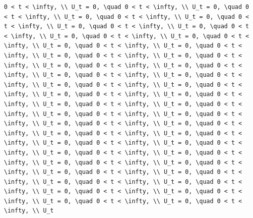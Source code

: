 \documentclass[
  ukrainian,
]{article}
\begin{document}
\begin{verbatim}
0 < t < \infty, \\ U_t = 0, \quad 0 < t < \infty, \\ U_t = 0, \quad 0 < t < \infty, \\ U_t = 0, \quad 0 < t < \infty, \\ U_t = 0, \quad 0 < t < \infty, \\ U_t = 0, \quad 0 < t < \infty, \\ U_t = 0, \quad 0 < t < \infty, \\ U_t = 0, \quad 0 < t < \infty, \\ U_t = 0, \quad 0 < t < \infty, \\ U_t = 0, \quad 0 < t < \infty, \\ U_t = 0, \quad 0 < t < \infty, \\ U_t = 0, \quad 0 < t < \infty, \\ U_t = 0, \quad 0 < t < \infty, \\ U_t = 0, \quad 0 < t < \infty, \\ U_t = 0, \quad 0 < t < \infty, \\ U_t = 0, \quad 0 < t < \infty, \\ U_t = 0, \quad 0 < t < \infty, \\ U_t = 0, \quad 0 < t < \infty, \\ U_t = 0, \quad 0 < t < \infty, \\ U_t = 0, \quad 0 < t < \infty, \\ U_t = 0, \quad 0 < t < \infty, \\ U_t = 0, \quad 0 < t < \infty, \\ U_t = 0, \quad 0 < t < \infty, \\ U_t = 0, \quad 0 < t < \infty, \\ U_t = 0, \quad 0 < t < \infty, \\ U_t = 0, \quad 0 < t < \infty, \\ U_t = 0, \quad 0 < t < \infty, \\ U_t = 0, \quad 0 < t < \infty, \\ U_t = 0, \quad 0 < t < \infty, \\ U_t = 0, \quad 0 < t < \infty, \\ U_t = 0, \quad 0 < t < \infty, \\ U_t = 0, \quad 0 < t < \infty, \\ U_t = 0, \quad 0 < t < \infty, \\ U_t = 0, \quad 0 < t < \infty, \\ U_t = 0, \quad 0 < t < \infty, \\ U_t = 0, \quad 0 < t < \infty, \\ U_t = 0, \quad 0 < t < \infty, \\ U_t = 0, \quad 0 < t < \infty, \\ U_t = 0, \quad 0 < t < \infty, \\ U_t = 0, \quad 0 < t < \infty, \\ U_t = 0, \quad 0 < t < \infty, \\ U_t = 0, \quad 0 < t < \infty, \\ U_t = 0, \quad 0 < t < \infty, \\ U_t
\end{verbatim}
\end{document}
